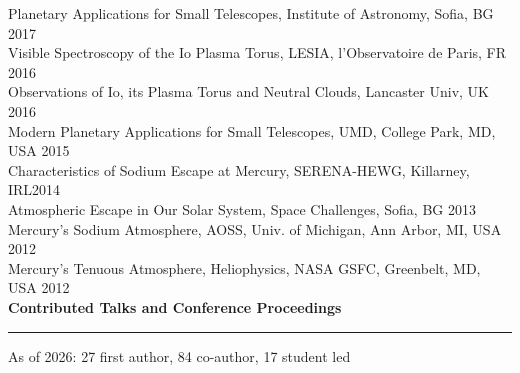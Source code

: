\documentclass[12pt]{report}
\begin{document}
\noindent Planetary Applications for Small Telescopes, Institute of Astronomy, Sofia, BG \hfill 2017\\
\noindent Visible Spectroscopy of the Io Plasma Torus, LESIA, l'Observatoire de Paris, FR \hfill 2016\\
\noindent Observations of Io, its Plasma Torus and Neutral Clouds, Lancaster Univ, UK \hfill 2016\\
\noindent Modern Planetary Applications for Small Telescopes, UMD, College Park, MD, USA \hfill 2015\\
\noindent Characteristics of Sodium Escape at Mercury, SERENA-HEWG, Killarney, IRL\hfill 2014\\
\noindent Atmospheric Escape in Our Solar System, Space Challenges, Sofia, BG \hfill 2013\\
\noindent Mercury's Sodium Atmosphere, AOSS, Univ. of Michigan, Ann Arbor, MI, USA \hfill 2012\\
\noindent Mercury's Tenuous Atmosphere, Heliophysics, NASA GSFC, Greenbelt, MD, USA \hfill 2012\\

\vspace{2 mm}
\noindent\textbf{Contributed Talks and Conference Proceedings} \rm\hspace*{\fill} \\
\rule{\textwidth}{1pt}
As of 2026: 27 first author, 84 co-author, 17 student led \\
\end{document}
